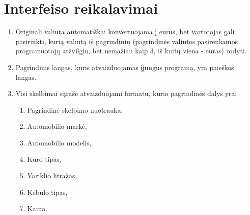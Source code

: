 \documentclass[12pt]{article}
\renewcommand{\thesubsection}{FR\arabic{subsection}}
\renewcommand*{\theenumi}{\thesubsection.\arabic{enumi}}
\begin{document}
	\section*{Interfeiso reikalavimai}	
	\setcounter{subsection}{0}
	\begin{enumerate}[labelindent=10pt,leftmargin=2.2cm]
		\item Originali valiuta automatiškai konvertuojama į eurus, bet vartotojas gali pasirinkti, kurią valiutą iš pagrindinių (pagrindinės valiutos pasirenkamos programuotojų atžvilgiu, bet nemažiau kaip 3, iš kurių viena - euras) rodyti.
		\item\label{MainWindowDisplayReq} Pagrindinis langas, kuris atvaizduojamas įjungus programą, yra paieškos langas. 
		\item\label{AdParts} Visi skelbimai sąraše atvaizduojami formatu, kurio pagrindinės dalys yra:
		
		\begin{enumerate}[label=\theenumi.\arabic{enumii}]
			\item Pagrindinė skelbimo nuotrauka,
			\item Automobilio markė,
			\item Automobilio modelis,
			\item Kuro tipas,
			\item Variklio litražas,
			\item Kėbulo tipas,
			\item Kaina.
		\end{enumerate}
		

\end{enumerate}
\end{document}
